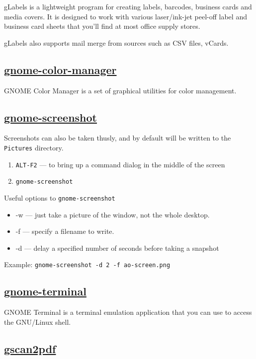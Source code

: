  gLabels is a lightweight program for creating labels, barcodes, business
 cards and media covers. It is designed to
 work with various laser/ink-jet peel-off label and business card sheets that
 you'll find at most office supply stores.
 
 gLabels also supports mail merge from sources such as CSV files, vCards.

\subsection{\href{https://git.gnome.org/browse/gnome-color-manager}{gnome-color-manager}}

 GNOME Color Manager is a set of graphical utilities for color
 management.

\subsection{\href{}{gnome-screenshot}}
Screenshots can also be taken thusly, and by default will be written to the
\texttt{Pictures} directory.

\begin{enumerate}
 \item\texttt{ALT-F2} --- to bring up a command dialog in the middle of the screen
 \item\texttt{gnome-screenshot}
\end{enumerate}

Useful options to \texttt{gnome-screenshot} 
\begin{itemize}
 \item{-w} --- just take a picture of the window, not the whole desktop.
 \item{-f} --- specify a filename to write.
 \item{-d} --- delay a specified number of seconds before taking a snapshot
\end{itemize}

Example:
\texttt{gnome-screenshot -d 2 -f ao-screen.png}

\subsection{\href{}{gnome-terminal}}

 GNOME Terminal is a terminal emulation application that you can use to
 access the GNU/Linux shell.

\subsection{\href{http://gscan2pdf.sourceforge.net/}{gscan2pdf}}

